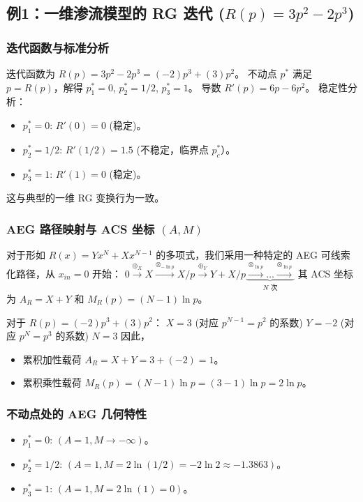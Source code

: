 \documentclass[12pt]{article}
\begin{document}
\subsection{例1：一维渗流模型的 RG 迭代 ($R(p) = 3p^2 - 2p^3$)}
\subsubsection{迭代函数与标准分析}
迭代函数为 $R(p) = 3p^2 - 2p^3 = (-2)p^3 + (3)p^2$。
不动点 $p^*$ 满足 $p = R(p)$，解得 $p_1^* = 0$, $p_2^* = 1/2$, $p_3^* = 1$。
导数 $R'(p) = 6p - 6p^2$。
稳定性分析：
\begin{itemize}
    \item $p_1^* = 0$: $R'(0) = 0$ (稳定)。
    \item $p_2^* = 1/2$: $R'(1/2) = 1.5$ (不稳定，临界点 $p_c^*$）。
    \item $p_3^* = 1$: $R'(1) = 0$ (稳定)。
\end{itemize}
这与典型的一维 RG 变换行为一致。

\subsubsection{AEG 路径映射与 ACS 坐标 $(A,M)$}
对于形如 $R(x) = Yx^N + Xx^{N-1}$ 的多项式，我们采用一种特定的 AEG 可线索化路径，从 $x_{in}=0$ 开始：
$0 \xrightarrow{\oplus_X} X \xrightarrow{\otimes_{-\ln p}} X/p \xrightarrow{\oplus_Y} Y+X/p \underbrace{\xrightarrow{\otimes_{\ln p}} \dots \xrightarrow{\otimes_{\ln p}}}_{N \text{ 次}}$
其 ACS 坐标为 $A_R = X+Y$ 和 $M_R(p) = (N-1)\ln p$。

对于 $R(p) = (-2)p^3 + (3)p^2$：
$X=3$ (对应 $p^{N-1}=p^2$ 的系数)
$Y=-2$ (对应 $p^N=p^3$ 的系数)
$N=3$
因此，
\begin{itemize}
    \item 累积加性载荷 $A_R = X+Y = 3 + (-2) = 1$。
    \item 累积乘性载荷 $M_R(p) = (N-1)\ln p = (3-1)\ln p = 2\ln p$。
\end{itemize}

\subsubsection{不动点处的 AEG 几何特性}
\begin{itemize}
    \item $p_1^* = 0$: $(A=1, M \rightarrow -\infty)$。
    \item $p_2^* = 1/2$: $(A=1, M = 2\ln(1/2) = -2\ln 2 \approx -1.3863)$。
    \item $p_3^* = 1$: $(A=1, M = 2\ln(1) = 0)$。
\end{itemize}
\end{document}
